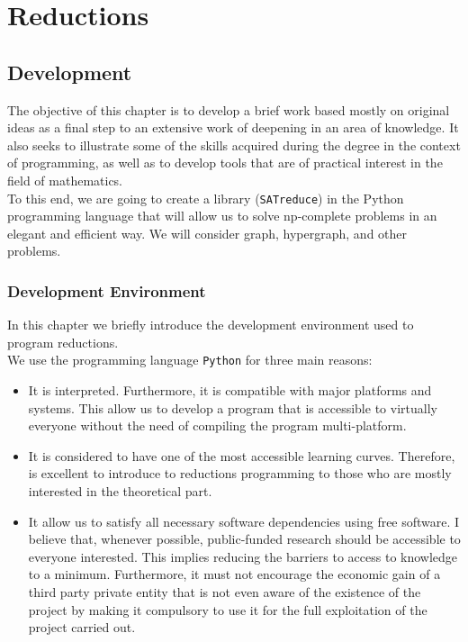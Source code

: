 \part{Reductions} %

\label{chap:3}


\chapter{Development}

The objective of this chapter is to develop a brief work based mostly on original ideas as a final step to an extensive work of deepening in an area of knowledge. It also seeks to illustrate some of the skills acquired during the degree in the context of programming, as well as to develop tools that are of practical interest in the field of mathematics. \\

To this end, we are going to create a library (\texttt{SATreduce}) in the Python  programming language that will allow us to solve np-complete problems in an elegant and efficient way.  We will consider graph, hypergraph, and other problems. 

\section{Development Environment}

In this chapter we briefly introduce the development environment used to program reductions.\\

We use the programming language \texttt{Python} for three main reasons:

\begin{itemize}
\item It is interpreted. Furthermore, it is compatible with major platforms and systems. This allow us to develop a program that is accessible to virtually everyone without the need of compiling the program multi-platform. 

\item It is considered to have one of the most accessible learning curves. Therefore, is excellent to introduce to reductions programming to those who are mostly interested in the theoretical part.

\item It allow us to satisfy all necessary software dependencies using  free software\cite{stallman2002free}. I believe that, whenever possible, public-funded research should be accessible to everyone interested. This implies reducing the barriers to access to knowledge to a minimum.  Furthermore, it must not encourage the economic gain of a third party private entity that is not even aware of the existence of the project by making it compulsory to use it for the full exploitation of the project carried out.
\end{itemize}




